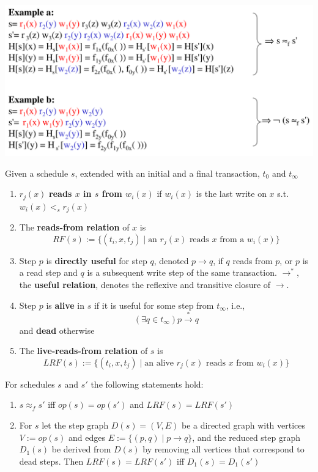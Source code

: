 \documentclass[11pt]{article}
\begin{document}
\begin{center}
\includegraphics[width=.7\textwidth]{../images/bigdatabase/13.png}
\label{}
\end{center}

\begin{definition}
Given a schedule \(s\), extended with an initial and a final transaction, \(t_0\)
and \(t_\infty\)
\begin{enumerate}
\item \(r_j(x)\) \textbf{reads \(x\) in \(s\) from \(w_i(x)\)} if \(w_i(x)\) is the last write on \(x\)
s.t. \(w_i(x)<_sr_j(x)\)
\item The \textbf{reads-from relation} of \(x\) is
\begin{equation*}
RF(s):=\{(t_i,x,t_j)\mid \text{an }r_j(x)\text{ reads \(x\) from a }w_i(x)\}
\end{equation*}
\item Step \(p\) is \textbf{directly useful} for step \(q\), denoted \(p\to q\), if \(q\) reads from \(p\),
or \(p\) is a read step and \(q\) is a subsequent write step of the same
transaction. \(\to^*\), the \textbf{useful relation}, denotes the reflexive and transitive closure of \(\to\).
\item Step \(p\) is \textbf{alive} in \(s\) if it is useful for some step from \(t_\infty\), i.e.,
\begin{equation*}
(\exists q\in t_\infty)p\xrightarrow{*}q
\end{equation*}
and \textbf{dead} otherwise
\item The \textbf{live-reads-from relation} of \(s\) is
\begin{equation*}
LRF(s):=\{(t_i,x,t_j)\mid \text{an alive \(r_j(x)\) reads \(x\) from \(w_i(x)\)}\}
\end{equation*}
\end{enumerate}
\end{definition}

\begin{theorem}[]
For schedules \(s\) and \(s'\) the following statements hold:
\begin{enumerate}
\item \(s\approx_fs'\) iff \(op(s)=op(s')\) and \(LRF(s)=LRF(s')\)
\item For \(s\) let the step graph \(D(s)=(V,E)\) be a directed graph with vertices \(V:=op(s)\)
and edges \(E:=\{(p,q)\mid p\to q\}\), and the reduced step graph \(D_1(s)\) be derived
from \(D(s)\) by removing all vertices that correspond to dead steps. Then \(LRF(s)=LRF(s')\)
iff \(D_1(s)=D_1(s')\)
\end{enumerate}
\end{theorem}
\end{document}
